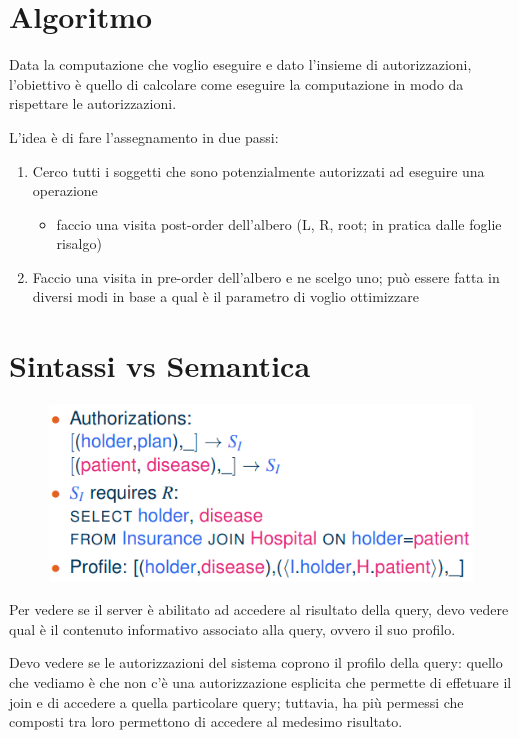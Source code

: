 \documentclass{report}
\begin{document}
\section{Algoritmo}
Data la computazione che voglio eseguire e dato l'insieme di autorizzazioni, l'obiettivo 
è quello di calcolare come eseguire la computazione in modo da rispettare le autorizzazioni.

\noindent L'idea è di fare l'assegnamento in due passi:
\begin{enumerate}
    \item Cerco tutti i soggetti che sono potenzialmente autorizzati ad eseguire una operazione 
    \begin{itemize}
        \item faccio una visita post-order dell'albero (L, R, root; in pratica dalle foglie risalgo) 
    \end{itemize}
    \item Faccio una visita in pre-order dell'albero e ne scelgo uno; può essere fatta in diversi modi in base a qual è il parametro di voglio ottimizzare
\end{enumerate}

\section{Sintassi vs Semantica}

\begin{figure}[H]
    \centering
    \includegraphics[width=0.7\linewidth]{images/sintassi-semantica.png}
\end{figure}

Per vedere se il server è abilitato ad accedere al risultato della query, devo vedere qual è il contenuto informativo associato 
alla query, ovvero il suo profilo.

\noindent Devo vedere se le autorizzazioni del sistema coprono il profilo della query: quello che vediamo è che non c'è una autorizzazione 
esplicita che permette di effetuare il join e di accedere a quella particolare query; tuttavia, ha più permessi che composti tra loro permettono 
di accedere al medesimo risultato.
\end{document}
